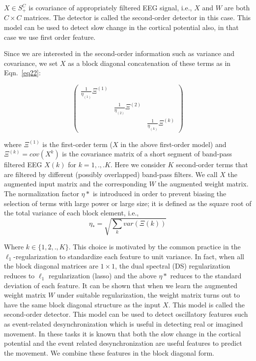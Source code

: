 $X\in S^{C}_+$ is covariance of appropriately filtered EEG signal, i.e., $X$ and $W$ are both $C \times C$ matrices. The detector is called the second-order detector in this case. This model can be used to detect slow change in the cortical potential also, in that case we use first order feature.

Since we are interested in the second-order information such as variance and covariance, we set $X$ as a block diagonal concatenation of these terms as in Eqn.~\ref{eq22}:

\begin{equation}\label{eq22}
\left(\begin{array}{ccc} {\frac{1}{\eta_{\left(1\right)}}\Xi^{\left(1\right)}} &   &  \\   & {\frac{1}{\eta_{\left(2\right)}}\Xi^{\left(2\right)}} &  \\   &   & {\frac{1}{\eta_{\left(k\right)}}\Xi^{\left(k\right)}} \end{array}\right)
\end{equation}

where $\Xi^{(1)}$ is the first-order term ($X$ in the above first-order model) and $\Xi^{(k)}= cov(X^k)$ is the covariance matrix of a short segment of band-pass filtered EEG $X(k)$ for $k=1,.,. K$. Here we consider $K$ second-order terms that are filtered by different (possibly overlapped) band-pass filters. We call $X$ the augmented input matrix and the corresponding $W$ the augmented weight matrix. The normalization factor $\eta*$ is introduced in order to prevent biasing the selection of terms with large power or large size; it is defined as the square root of the total variance of each block element, i.e., 
\begin{equation}
\eta_\ast=\sqrt{\sum_{k}var\left(\Xi\left(k\right)\right)}
\end{equation}

Where $k \in \lbrace 1,2,.,K \rbrace$. This choice is motivated by the common practice in the $\ell_1$-regularization  to standardize each feature to unit variance. In fact, when all the block diagonal matrices are $1\times1$, the dual spectral (DS) regularization reduces to $\ell_1$ regularization (lasso) and the above $\eta*$ reduces to the standard deviation of each feature. It can be shown that when we learn the augmented weight matrix $W$ under suitable regularization, the weight matrix turns out to have the same block diagonal structure as the input $X$. This model is called the second-order detector. This model can be used to detect oscillatory features such as event-related desynchronization which is useful in detecting real or imagined movement. In these tasks it is known that both the slow change in the cortical potential and the event related desynchronization are useful features to predict the movement. We combine these features in the block diagonal form.

